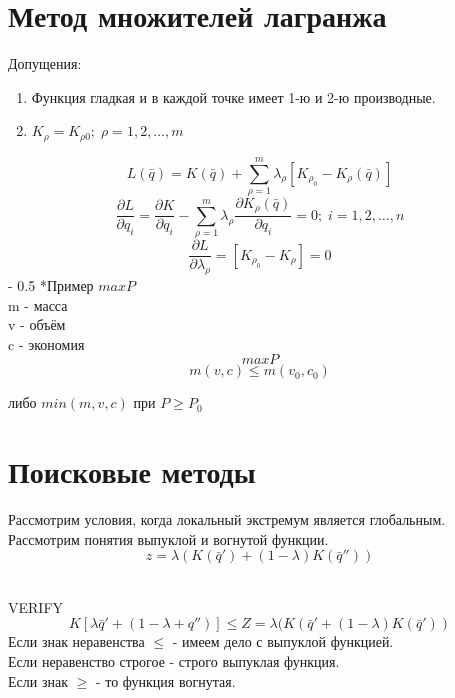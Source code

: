 \documentclass[12pt,a5paper]{scrbook}
\makeatletter
\renewcommand\paragraph{\@startsection{paragraph}{4}{0mm}%
{-\baselineskip} %
{0.5\baselineskip} %
{\normalfont\bfseries}}%
\makeatother
\begin{document}
  \section{Метод множителей лагранжа}
  Допущения:
  \begin{enumerate}
  	\item Функция гладкая и в каждой точке имеет 1-ю и 2-ю производные.
  	\item $K_\rho = K_{\rho0}; \; \rho = 1,2,\ldots,m$  		
  \end{enumerate}
  $$L(\bar{q}) = K(\bar{q}) + \sum_{\rho=1}^{m} \lambda_\rho[K_{\rho_0} - K_\rho(\bar{q})]$$
  $$\frac{\partial L}{\partial q_i} = \frac{\partial K}{\partial q_i} - \sum_{\rho=1}^{m} \lambda_\rho \frac{\partial K_\rho(\bar{q})}{\partial q_i} = 0; \; i=1,2,\ldots,n$$
  $$\frac{\partial L}{\partial \lambda_\rho} = [K_{\rho_0} - K_\rho] = 0$$
  \paragraph*{Пример}
  $max P$ \\
  m - масса \\
  v - объём \\
  c - экономия \\
  $$max P$$
  $$m(v,c) \leq m(v_0,c_0)$$
  \begin{center}
	либо $min(m,v,c)$ при $P \geq P_0$
  \end{center}
  \section{Поисковые методы}
  Рассмотрим условия, когда локальный экстремум является глобальным. Рассмотрим понятия выпуклой и вогнутой функции.\\
  $$z = \lambda (K(\bar{q}') + (1-\lambda)K(\bar{q}''))$$  
  \\VERIFY  
  $$K[\lambda \bar{q}' + (1-\lambda+q'')] \leq Z = \lambda(K(\bar{q}' + (1-\lambda)K(\bar{q}'))$$
  Если знак неравенства $\leq$ - имеем дело с выпуклой функцией.\\
  Если неравенство строгое - строго выпуклая функция.\\
  Если знак $\geq$ - то функция вогнутая.\\
  
\end{document}
